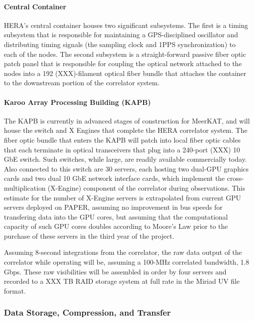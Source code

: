 \documentclass[preprint]{aastex}
\begin{document}
\paragraph{Central Container}

HERA's central container houses two significant subsystems.  The first is a timing subsystem
that is responsible for maintaining a GPS-disciplined oscillator and distributing timing
signals (the sampling clock and 1PPS synchronization) to each of the nodes.  The second
subsystem is a straight-forward passive fiber optic patch panel that is responsible for coupling
the optical network attached to the nodes into a 192 (XXX)-filament optical fiber bundle
that attaches the container to the downstream portion of the correlator system.

\paragraph{Karoo Array Processing Building (KAPB)}

The KAPB is currently
in advanced stages of construction for MeerKAT, and will house the switch and X Engines that
complete the HERA correlator system.  The fiber optic bundle that enters the KAPB will patch
into local fiber optic cables 
that each terminate in optical transceivers that plug into a 240-port (XXX) 10 GbE switch.
Such switches, while large, are readily available commercially today.  Also connected to
this switch are 30 servers, each hosting two dual-GPU graphics cards and two dual
10 GbE network interface cards, which implement the cross-multiplication (X-Engine) component
of the correlator during observations.  This estimate for the number of X-Engine servers
is extrapolated from current GPU servers deployed on PAPER, assuming no improvement in bus
speeds for transfering data into the GPU cores, but assuming that the computational
capacity of such GPU cores doubles according to Moore's Law prior to the purchase of
these servers in the third year of the project.

Assuming 8-second integrations from the correlator, the raw data output of the
correlator while operating will be, assuming a 100-MHz correlated bandwidth, 1.8 Gbps.
These raw visibilities will be assembled in order by four servers
and recorded to a XXX TB RAID storage system at full rate in the Miriad UV
file format.

\subsubsection{Data Storage, Compression, and Transfer}
\end{document}
